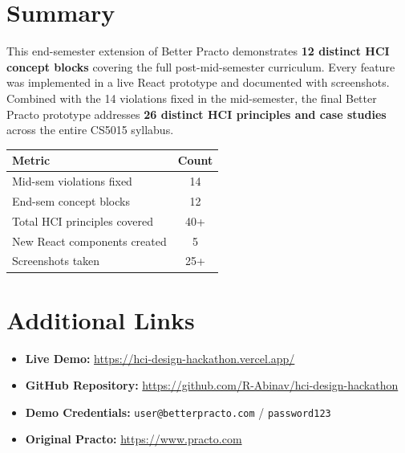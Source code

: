 \documentclass[12pt, a4paper]{article}
\begin{document}
\section{Summary}

This end-semester extension of Better Practo demonstrates \textbf{12 distinct HCI concept blocks} covering the full post-mid-semester curriculum. Every feature was implemented in a live React prototype and documented with screenshots. Combined with the 14 violations fixed in the mid-semester, the final Better Practo prototype addresses \textbf{26 distinct HCI principles and case studies} across the entire CS5015 syllabus.

\begin{center}
\begin{tabular}{l c}
\toprule
\textbf{Metric} & \textbf{Count} \\
\midrule
Mid-sem violations fixed & 14 \\
End-sem concept blocks & 12 \\
Total HCI principles covered & 40+ \\
New React components created & 5 \\
Screenshots taken & 25+ \\
\bottomrule
\end{tabular}
\end{center}

\vspace{0.5cm}

\section{Additional Links}

\begin{itemize}[leftmargin=1.5em]
  \item \textbf{Live Demo:} \url{https://hci-design-hackathon.vercel.app/}
  \item \textbf{GitHub Repository:} \url{https://github.com/R-Abinav/hci-design-hackathon}
  \item \textbf{Demo Credentials:} \texttt{user@betterpracto.com} / \texttt{password123}
  \item \textbf{Original Practo:} \url{https://www.practo.com}
\end{itemize}
\end{document}
